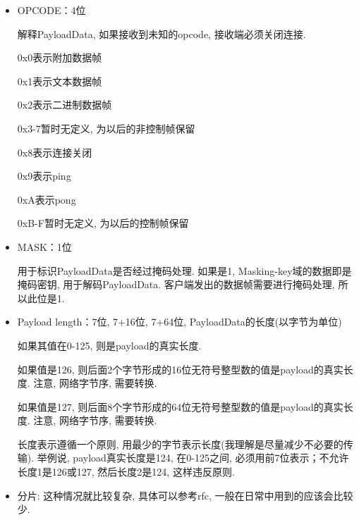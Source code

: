 {\begin {itemize}
    \item {OPCODE：4位}\par
          {解释PayloadData, 如果接收到未知的opcode, 接收端必须关闭连接.}\par
          {0x0表示附加数据帧}\par
          {0x1表示文本数据帧}\par
          {0x2表示二进制数据帧}\par
          {0x3-7暂时无定义, 为以后的非控制帧保留}\par
          {0x8表示连接关闭}\par
          {0x9表示ping}\par
          {0xA表示pong}\par
          {0xB-F暂时无定义, 为以后的控制帧保留}\par

    \item {MASK：1位}\par
          {用于标识PayloadData是否经过掩码处理. 如果是1, Masking-key域的数据即是掩码密钥, 用于解码PayloadData. 客户端发出的数据帧需要进行掩码处理, 所以此位是1.}\par

    \item {Payload length：7位, 7+16位, 7+64位,  PayloadData的长度(以字节为单位)}\par
          {如果其值在0-125, 则是payload的真实长度.}\par
          {如果值是126, 则后面2个字节形成的16位无符号整型数的值是payload的真实长度. 注意, 网络字节序, 需要转换.}\par
          {如果值是127, 则后面8个字节形成的64位无符号整型数的值是payload的真实长度. 注意, 网络字节序, 需要转换.}\par
          {长度表示遵循一个原则, 用最少的字节表示长度(我理解是尽量减少不必要的传输). 举例说, payload真实长度是124, 在0-125之间, 必须用前7位表示；不允许长度1是126或127, 然后长度2是124, 这样违反原则.}\par

    \item {分片: 这种情况就比较复杂, 具体可以参考rfc, 一般在日常中用到的应该会比较少.}\par
    \end {itemize}
}

